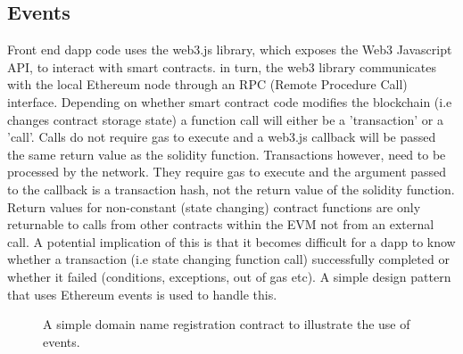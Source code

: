 \subsection{Events}
\label{subsec:events}
Front end dapp code uses the web3.js library\cite{Web3JS}, which exposes the Web3 Javascript API\cite{JavascriptAPI}, to interact with smart contracts. in turn, the web3 library communicates with the local Ethereum node through an RPC (Remote Procedure Call) interface. Depending on whether smart contract code modifies the blockchain (i.e changes contract storage state) a function call will either be a 'transaction' or a 'call'. Calls do not require gas to execute and a web3.js callback will be passed the same return value as the solidity function. Transactions however, need to be processed by the network. They require gas to execute and the argument passed to the callback is a transaction hash, not the return value of the solidity function. Return values for non-constant (state changing) contract functions are only returnable to calls from other contracts within the EVM not from an external call. A potential implication of this is that it becomes difficult for a dapp to know whether a transaction (i.e state changing function call) successfully completed or whether it failed (conditions, exceptions, out of gas etc). A simple design pattern that uses Ethereum events is used to handle this. \\
\begin{figure}
\centering
{}
\decoRule
\caption[Example DNS Contract]{A simple domain name registration contract to illustrate the use of events.}
\label{fig:DNSContract}
\end{figure}

